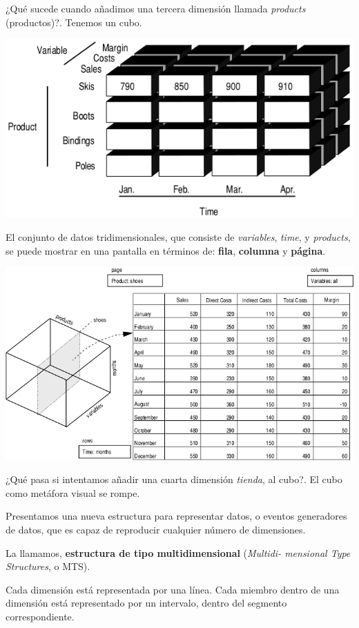 \documentclass{fancyslides}
\begin{document}
\begin{frame}
\misc
{
¿Qué sucede cuando añadimos una tercera dimensión llamada \textit{products} (productos)?.
Tenemos un cubo.

\begin{center}
\includegraphics[scale=0.4]{cube_2}
\end{center}
}
\end{frame}

\begin{frame}
\misc
{
El conjunto de datos tridimensionales, que consiste de \textit{variables}, \textit{time}, y \textit{products}, se puede mostrar en una pantalla en términos de: \textbf{fila}, \textbf{columna} y \textbf{página}.

\begin{center}
\includegraphics[scale=0.32]{cube_3}
\end{center}
}
\end{frame}


\begin{frame}
\misc
{
¿Qué pasa si intentamos añadir una cuarta dimensión \textit{tienda}, al cubo?. El cubo como metáfora visual se rompe.
\newline

Presentamos una nueva estructura para representar datos, o eventos generadores de datos, que es capaz de reproducir cualquier número de dimensiones.

La llamamos, \textbf{estructura de tipo multidimensional} (\textit{Multidi- mensional Type Structures}, o MTS).

Cada dimensión está representada por una línea. Cada miembro dentro de una dimensión está representado por un intervalo, dentro del segmento correspondiente.
}
\end{frame}
\end{document}
